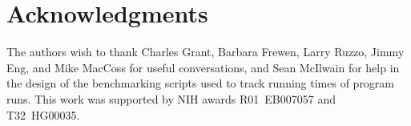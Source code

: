 \section*{Acknowledgments}

The authors wish to thank Charles Grant, Barbara Frewen, Larry Ruzzo,
Jimmy Eng, and Mike MacCoss for useful conversations, and Sean
McIlwain for help in the design of the benchmarking scripts used to
track running times of program runs. This work was supported by NIH
awards R01~EB007057 and T32~HG00035.








